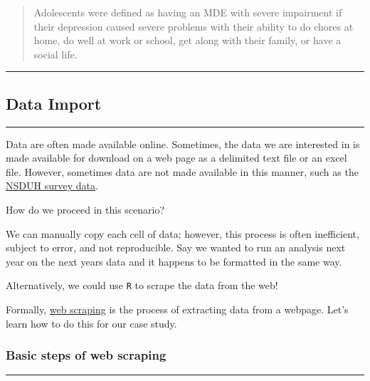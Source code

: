 \documentclass[
]{article}
\begin{document}
\begin{quote}
Adolescents were defined as having an MDE with severe impairment if
their depression caused severe problems with their ability to do chores
at home, do well at work or school, get along with their family, or have
a social life.
\end{quote}

\begin{center}\rule{0.5\linewidth}{0.5pt}\end{center}

\hypertarget{data-import}{%
\subsection{\texorpdfstring{\textbf{Data
Import}}{Data Import}}\label{data-import}}

\begin{center}\rule{0.5\linewidth}{0.5pt}\end{center}

Data are often made available online. Sometimes, the data we are
interested in is made available for download on a web page as a
delimited text file or an excel file. However, sometimes data are not
made available in this manner, such as the
\href{https://www.samhsa.gov/data/sites/default/files/cbhsq-reports/NSDUHDetailedTabs2018R2/NSDUHDetTabsSect11pe2018.htm}{NSDUH
survey data}.

How do we proceed in this scenario?

We can manually copy each cell of data; however, this process is often
inefficient, subject to error, and not reproducible. Say we wanted to
run an analysis next year on the next years data and it happens to be
formatted in the same way.

Alternatively, we could use \texttt{R} to scrape the data from the web!

Formally,
\href{https://en.wikipedia.org/wiki/Web_scraping?oldformat=true}{web
scraping} is the process of extracting data from a webpage. Let's learn
how to do this for our case study.

\hypertarget{basic-steps-of-web-scraping}{%
\subsubsection{\texorpdfstring{\textbf{Basic steps of web
scraping}}{Basic steps of web scraping}}\label{basic-steps-of-web-scraping}}

\begin{center}\rule{0.5\linewidth}{0.5pt}\end{center}
\end{document}
